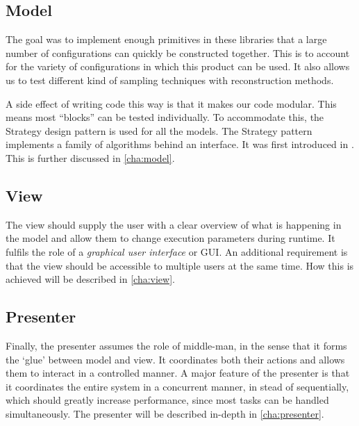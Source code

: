 \documentclass[a4paper, openany, oneside]{memoir}
\begin{document}
\subsection{Model}
\label{sub:model}
The goal was to implement enough primitives in these libraries that a large number of configurations can quickly be constructed together. This is to account for the variety of configurations in which this product can be used. It also allows us to test different kind of sampling techniques with reconstruction methods.

A side effect of writing code this way is that it makes our code modular. This means most ``blocks'' can be tested individually. To accommodate this, the Strategy design pattern is used for all the models. The Strategy pattern implements a family of algorithms behind an interface. It was first introduced in \cite{designpatterns}. This is further discussed in \cref{cha:model}.

\subsection{View}
\label{sub:view}
The view should supply the user with a clear overview of what is happening in the model and allow them to change execution parameters during runtime. It fulfils the role of a \emph{graphical user interface} or GUI. An additional requirement is that the view should be accessible to multiple users at the same time. How this is achieved will be described in \cref{cha:view}.

\subsection{Presenter}
\label{sub:presenter}
Finally, the presenter assumes the role of middle-man, in the sense that it forms the `glue' between model and view. It coordinates both their actions and allows them to interact in a controlled manner. A major feature of the presenter is that it coordinates the entire system in a concurrent manner, in stead of sequentially, which should greatly increase performance, since most tasks can be handled simultaneously. The presenter will be described in-depth in \cref{cha:presenter}.
\end{document}
